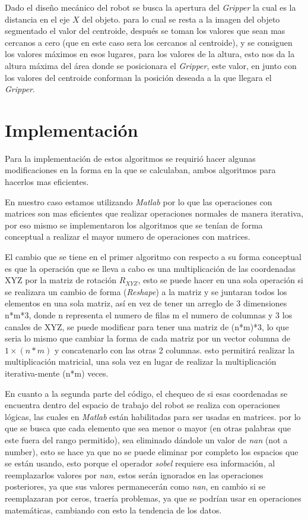     Dado el diseño mecánico del robot se busca la apertura del \textit{Gripper} la cual es la distancia en el eje $X$ del objeto. para lo cual se resta a la imagen del objeto segmentado el valor del centroide, después se toman los valores que sean mas cercanos a cero (que en este caso sera los cercanos al centroide), y  se consiguen los valores máximos en esos lugares, para los valores de la altura,  esto nos da la altura máxima del área donde se posicionara el \textit{Gripper}, este valor, en junto con los valores del centroide conforman la posición deseada a la que llegara el \textit{Gripper}.
    
    \section{Implementación}
    
    Para la implementación de estos algoritmos se requirió hacer algunas modificaciones en la forma en la que se calculaban, ambos algoritmos para hacerlos mas eficientes.
    
    En nuestro caso estamos utilizando \textit{Matlab} por lo que las operaciones con matrices son mas eficientes que realizar operaciones normales de manera iterativa, por eso mismo se implementaron los algoritmos que se tenían de forma conceptual a realizar el mayor numero de operaciones con matrices. 
    
    El cambio que se tiene en el primer algoritmo con respecto a su forma conceptual es que la operación que se lleva a cabo es una multiplicación de las coordenadas XYZ por la matriz de rotación $R_{XYZ}$, esto se puede hacer en una sola operación si se realizara un cambio de forma (\textit{Reshape}) a la matriz y se juntaran todos los elementos en una sola matriz, así en vez de tener un arreglo de 3 dimensiones n*m*3, donde n representa el numero de filas m el numero de columnas y 3 los canales de XYZ, se puede modificar para tener una matriz de (n*m)*3, lo que seria lo mismo que cambiar la forma de cada matriz por un vector columna de $1\times(n*m)$ y concatenarlo con las otras 2 columnas. esto permitirá realizar la multiplicación matricial, una sola vez en lugar de realizar la multiplicación iterativa-mente (n*m) veces.   
    
    En cuanto a la segunda parte del código, el chequeo de si esas coordenadas se encuentra dentro del espacio de trabajo del robot se realiza con operaciones lógicas, las cuales en \textit{Matlab} están habilitadas para ser usadas en matrices. por lo que se busca que cada elemento que sea menor o mayor (en otras palabras que este fuera del  rango permitido), sea eliminado dándole un valor de \textit{nan} (not a number), esto se hace ya que no se puede eliminar por completo los espacios que se están usando, esto porque el operador \textit{sobel} requiere esa información, al reemplazarlos valores por \textit{nan}, estos serán ignorados en las operaciones posteriores, ya que sus valores permanecerán como \textit{nan}, en cambio si se reemplazaran por ceros, traería problemas, ya que se podrían usar en operaciones matemáticas, cambiando con esto la tendencia de los datos.
    

